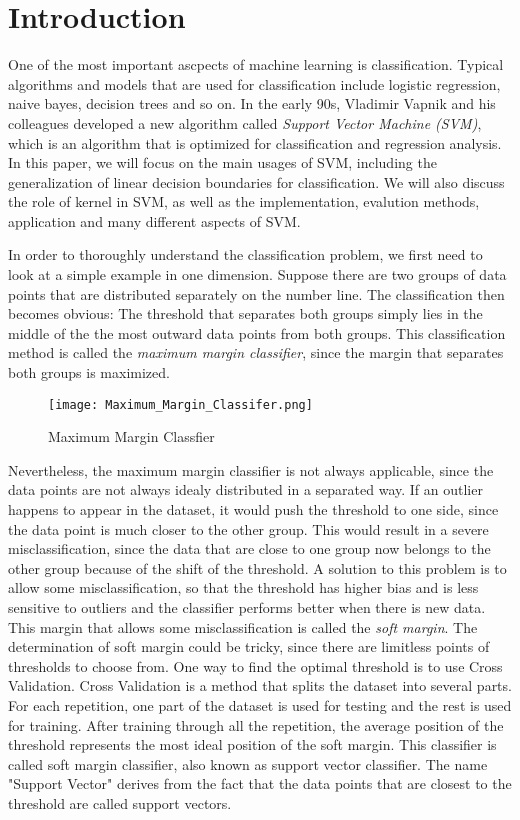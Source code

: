 
\section{Introduction}
One of the most important ascpects of machine learning is classification. Typical algorithms and models
that are used for classification include logistic regression, naive bayes, decision trees and so on. In the early 90s, 
Vladimir Vapnik and his colleagues developed a new algorithm called \emph{Support Vector Machine (SVM)}, which is an algorithm 
that is optimized for classification and regression analysis. In this paper,
we will focus on the main usages of SVM, including the generalization of linear decision boundaries for classification.
We will also discuss the role of kernel in SVM, as well as the implementation, evalution methods, application and many
different aspects of SVM.

In order to thoroughly understand the classification problem, we first need to look at a simple example in one dimension.
Suppose there are two groups of data points that are distributed separately on the number line. The classification then
becomes obvious: The threshold that separates both groups simply lies in the middle of the the most outward data points
from both groups. This classification method is called the \emph{maximum margin classifier}, since the margin that separates both
groups is maximized.

\begin{figure}[h]%
    \begin{center}%
        \texttt{[image: Maximum\_Margin\_Classifer.png]}%
        \caption{Maximum Margin Classfier}\label{fig:}%
    \end{center}%
\end{figure}

Nevertheless, the maximum margin classifier is not always applicable, since the data points are not always idealy distributed
in a separated way. If an outlier happens to appear in the dataset, it would push the threshold to one side, since the data point
is much closer to the other group. This would result in a severe misclassification, since the data that are close to one
group now belongs to the other group because of the shift of the threshold. A solution to this problem is to allow some
misclassification, so that the threshold has higher bias and is less sensitive to outliers and the classifier performs better
when there is new data. This margin that allows some misclassification is called the \emph{soft margin}. The determination of soft margin 
could be tricky, since there are limitless points of thresholds to choose from. One way to find the optimal threshold
is to use Cross Validation. Cross Validation is a method that splits the dataset into several parts. For each repetition, 
one part of the dataset is used for testing and the rest is used for training. After training through all the repetition, the 
average position of the threshold represents the most ideal position of the soft margin. This classifier is called
soft margin classifier, also known as support vector classifier. The name "Support Vector" derives from the fact that
the data points that are closest to the threshold are called support vectors.

